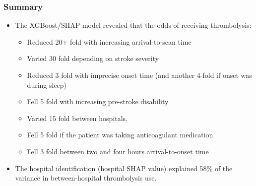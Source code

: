 
\begin{frame}
\frametitle{Summary}

\begin{itemize}
    \setlength{\itemsep}{2.5mm}
    \item The XGBoost/SHAP model revealed that the odds of receiving thrombolysis:    
    \begin{itemize}
        \vspace{2mm}
        \setlength{\itemsep}{2.5mm}
        \item Reduced 20+ fold with increasing arrival-to-scan time
        \item Varied 30 fold depending on stroke severity
        \item Reduced 3 fold with imprecise onset time (and another 4-fold if onset was during sleep)
        \item Fell 5 fold with increasing pre-stroke disability
        \item Varied 15 fold between hospitals.
        \item Fell 5 fold if the patient was taking anticoagulant medication
        \item Fell 3 fold between two and four hours arrival-to-onset time
    \end{itemize}

\item The hospital identification (hospital SHAP value) explained 58\% of the variance in between-hospital thrombolysis use. 
\end{itemize}

\end{frame}
